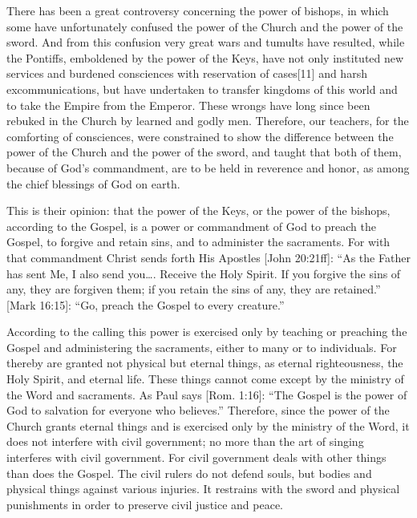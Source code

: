 There has been a great controversy concerning the power of bishops, in which some have unfortunately confused the power of the Church and the power of the sword. And from this confusion very great wars and tumults have resulted, while the Pontiffs, emboldened by the power of the Keys, have not only instituted new services and burdened consciences with reservation of cases[11] and harsh excommunications, but have undertaken to transfer kingdoms of this world and to take the Empire from the Emperor. These wrongs have long since been rebuked in the Church by learned and godly men. Therefore, our teachers, for the comforting of consciences, were constrained to show the difference between the power of the Church and the power of the sword, and taught that both of them, because of God’s commandment, are to be held in reverence and honor, as among the chief blessings of God on earth.

This is their opinion: that the power of the Keys, or the power of the bishops, according to the Gospel, is a power or commandment of God to preach the Gospel, to forgive and retain sins, and to administer the sacraments. For with that commandment Christ sends forth His Apostles [John 20:21ff]: “As the Father has sent Me, I also send you…. Receive the Holy Spirit. If you forgive the sins of any, they are forgiven them; if you retain the sins of any, they are retained.” [Mark 16:15]: “Go, preach the Gospel to every creature.”

According to the calling this power is exercised only by teaching or preaching the Gospel and administering the sacraments, either to many or to individuals. For thereby are granted not physical but eternal things, as eternal righteousness, the Holy Spirit, and eternal life. These things cannot come except by the ministry of the Word and sacraments. As Paul says [Rom. 1:16]: “The Gospel is the power of God to salvation for everyone who believes.” Therefore, since the power of the Church grants eternal things and is exercised only by the ministry of the Word, it does not interfere with civil government; no more than the art of singing interferes with civil government. For civil government deals with other things than does the Gospel. The civil rulers do not defend souls, but bodies and physical things against various injuries. It restrains with the sword and physical punishments in order to preserve civil justice and peace.

